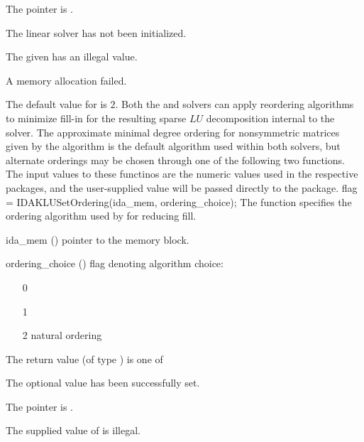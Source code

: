 {{\begin{args}
    The  pointer is .
  \item[\Id{IDASLS\_LMEM\_NULL}]
    The {\idaklu} linear solver has not been initialized.
  \item[\Id{IDASLS\_ILL\_INPUT}]
    The given  has an illegal value.
  \item[\Id{IDASLS\_MEM\_FAIL}]
    A memory allocation failed.
  \end{args}
}
{
  The default value for  is $2$.
}
Both the {\idaklu} and {\idasuperlumt} solvers can apply reordering
algorithms to minimize fill-in for the resulting sparse $LU$
decomposition internal to the solver.  The approximate minimal degree
ordering for nonsymmetric matrices given by the  algorithm
is the default algorithm used within both solvers, but alternate
orderings may be chosen through one of the following two functions.
The input values to these functinos are the numeric values used in the respective
packages, and the user-supplied value will be passed directly to the package.
{
  flag = IDAKLUSetOrdering(ida\_mem, ordering\_choice);
}
{
  The function  specifies the ordering algorithm
  used by {\idaklu} for reducing fill.
}
{
  \begin{args}
  \item[ida\_mem] ()
    pointer to the {\ida} memory block.
  \item[ordering\_choice] ()
    flag denoting algorithm choice:
    \begin{itemize}
    \item[0] 
    \item[1] 
    \item[2] natural ordering
    \end{itemize}
  \end{args}
}
{
  The return value  (of type ) is one of
  \begin{args}
  \item[\Id{IDASLS\_SUCCESS}] 
    The optional value has been successfully set.
  \item[\Id{IDASLS\_MEM\_NULL}]
    The  pointer is .
  \item[\Id{IDASLS\_ILL\_INPUT}]
    The supplied value of  is illegal.

\end{args}}}
